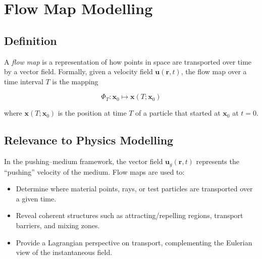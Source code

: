 \section*{Flow Map Modelling}

\subsection*{Definition}
A \emph{flow map} is a representation of how points in space are transported over time by a vector field.  
Formally, given a velocity field $\mathbf{u}(\mathbf{r},t)$, the flow map over a time interval $T$ is the mapping


\[
\Phi_T : \mathbf{x}_0 \mapsto \mathbf{x}(T; \mathbf{x}_0)
\]


where $\mathbf{x}(T; \mathbf{x}_0)$ is the position at time $T$ of a particle that started at $\mathbf{x}_0$ at $t=0$.

\subsection*{Relevance to Physics Modelling}
In the pushing--medium framework, the vector field $\mathbf{u}_g(\mathbf{r},t)$ represents the ``pushing'' velocity of the medium.  
Flow maps are used to:
\begin{itemize}
    \item Determine where material points, rays, or test particles are transported over a given time.
    \item Reveal coherent structures such as attracting/repelling regions, transport barriers, and mixing zones.
    \item Provide a Lagrangian perspective on transport, complementing the Eulerian view of the instantaneous field.
\end{itemize}

